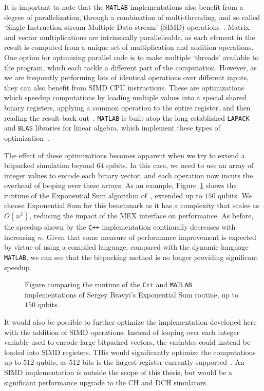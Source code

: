 It is important to note that the \texttt{MATLAB} implementations also benefit from a degree of parallelization, through a combination of multi-threading, and so called `Single Instruction stream Multiple Data stream' (SIMD) operations~\cite{Flynn1972}. Matrix and vector multiplications are intrinsically parallelisable, as each element in the result is computed from a unique set of multiplication and addition operations. One option for optimising parallel code is to make multiple `threads' available to the program, which each tackle a different part of the computation. However, as we are frequently performing lots of identical operations over different inputs, they can also benefit from SIMD CPU instructions. These are optimizations which speedup computations by loading multiple values into a special shared binary registers, applying a common operation to the entire register, and then reading the result back out~\cite{SIMD}. \texttt{MATLAB} is built atop the long established \texttt{LAPACK} and \texttt{BLAS} libraries for linear algebra, which implement these types of optimization~\cite{MATLABTech,LAPACK,BLAS}.\par
The effect of these optimizations becomes apparent when we try to extend a bitpacked simulation beyond $64$ qubits. In this case, we need to use an array of integer values to encode each binary vector, and each operation now incurs the overhead of looping over these arrays. As an example, Figure~\ref{fig:big_sum} shows the runtime of the Exponential Sum algorithm of~\cite{Bravyi2018}, extended up to $150$ qubits. We choose Exponential Sum for this benchmark as it has a complexity that scales as $O(n^{3})$, reducing the impact of the MEX interface on performance. As before, the speedup shown by the \texttt{C++} implementation continually decreases with increasing $n$. Given that some measure of performance improvement is expected by virtue of using a compiled language, compared with the dynamic language \texttt{MATLAB}, we can see that the bitpacking method is no longer providing significant speedup.
\par
\begin{figure}[t]
    \centering
    \begin{scaletikzpicturetowidth}{0.8\textwidth}
        
    \end{scaletikzpicturetowidth}
    \caption{Figure comparing the runtime of the \texttt{C++} and \texttt{MATLAB} implementations of Sergey Bravyi's Exponential Sum routine, up to $150$ qubits.}
    \label{fig:big_sum}
\end{figure}
It would also be possible to further optimize the implementation developed here with the addition of SIMD operations. Instead of looping over each integer variable used to encode large bitpacked vectors, the variables could instead be loaded into SIMD registers. THis would significantly optimize the computations up to $512$ qubits, as 512 bits is the largest register currently supported~\cite{SIMD}. An SIMD implementation is outside the scope of this thesis, but would be a significant performance upgrade to the CH and DCH simulators.
